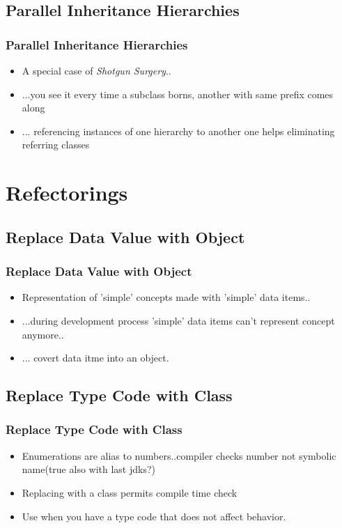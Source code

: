 \documentclass{beamer}
\begin{document}
\subsection{Parallel Inheritance Hierarchies}
\begin{frame}
  \frametitle{Parallel Inheritance Hierarchies}
  \begin{itemize}
	\item<+-> A special case of \textit{Shotgun Surgery}..
	\item<+-> ...you see it every time a subclass borns, another with same prefix comes along 
	\item<+-> ... referencing instances of one hierarchy to another one helps eliminating referring classes
  \end{itemize}
\end{frame}

\section{Refectorings}
\subsection{Replace Data Value with Object}
\begin{frame}
  \frametitle{Replace Data Value with Object}
  \begin{itemize}
	\item<+-> Representation of 'simple' concepts made with 'simple' data items..
	\item<+-> ...during development process 'simple' data items can't represent concept anymore..
	\item<+-> ... covert data itme into an object.
  \end{itemize}
\end{frame}

\subsection{Replace Type Code with Class}
\begin{frame}
  \frametitle{Replace Type Code with Class}
  \begin{itemize}
	\item<+-> Enumerations are alias to numbers..compiler checks number not symbolic name(true also with last jdks?)
	\item<+-> Replacing with a class permits compile time check
	\item<+-> Use when you have a type code that does not affect behavior.
  \end{itemize}
\end{frame}
\end{document}
